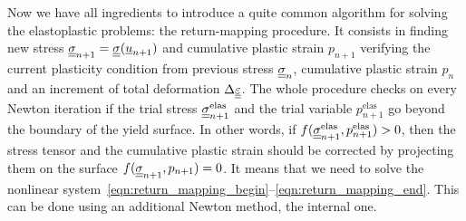 \documentclass[12pt]{article}
\begin{document}
Now we have all ingredients to introduce a quite common algorithm for solving the elastoplastic problems: the return-mapping procedure. It consists in finding new stress $\underline{\underline{\sigma}}_{n+1} = \underline{\underline{\sigma}}(\underline{u}_{n+1})$ and cumulative plastic strain $p_{n+1}$ verifying the current plasticity condition from previous stress $\underline{\underline{\sigma}}_{n}$, cumulative plastic strain $p_n$ and an increment of total deformation $\Delta\underline{\underline{\varepsilon}}$. The whole procedure checks on every Newton iteration if the trial stress $\underline{\underline{\sigma}}_{n+1}^{\text{elas}}$ and the trial variable $p_{n+1}^\text{elas}$ go beyond the boundary of the yield surface. In other words, if $f(\underline{\underline{\sigma}}_{n+1}^{\text{elas}}, p_{n+1}^\text{elas}) > 0$, then the stress tensor and the cumulative plastic strain should be corrected by projecting them on the surface $f(\underline{\underline{\sigma}}_{n+1}, p_{n+1}) = 0$. It means that we need to solve the nonlinear system~\eqref{eqn:return_mapping_begin}--\eqref{eqn:return_mapping_end}. This can be done using an additional Newton method, the internal one.

\end{document}

